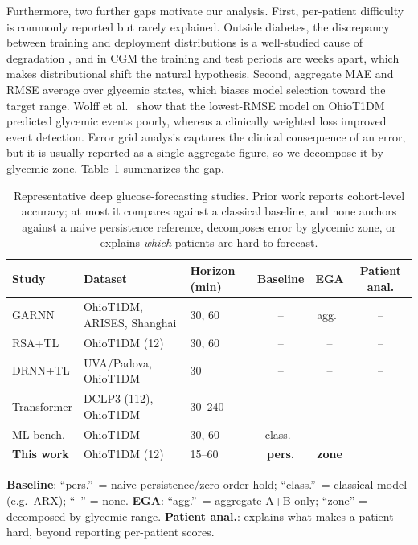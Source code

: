 \documentclass[conference]{IEEEtran}
\newcommand{\yes}{\checkmark}
\newcommand{\no}{--}
\begin{document}
Furthermore, two further gaps motivate our analysis. First, per-patient difficulty is commonly
reported but rarely explained. Outside diabetes, the discrepancy between training
and deployment distributions is a well-studied cause of degradation
\cite{QuinoneroCandela2009, MorenoTorres2012}, and in CGM the training and test
periods are weeks apart, which makes distributional shift the natural hypothesis. Second, aggregate MAE and RMSE average over
glycemic states, which biases model selection toward the target range. Wolff et
al.~\cite{Wolff2025} show that the lowest-RMSE model on OhioT1DM predicted glycemic
events poorly, whereas a clinically weighted loss improved event detection. Error
grid analysis \cite{Clarke1987ClinicalAccuracy, Parkes2000Consensus} captures the
clinical consequence of an error, but it is usually reported as a single aggregate
figure, so we decompose it by glycemic zone. Table~\ref{tab:related} summarizes the gap.

\begin{table}[t]
\centering
\caption{Representative deep glucose-forecasting studies. Prior work reports
cohort-level accuracy; at most it compares against a classical baseline, and none
anchors against a naive persistence reference, decomposes error by glycemic zone,
or explains \emph{which} patients are hard to forecast.}
\label{tab:related}
\scriptsize
\setlength{\tabcolsep}{3.5pt}
\renewcommand{\arraystretch}{1.15}
\begin{tabular}{@{}p{1.55cm}p{1.5cm}p{0.85cm}ccc@{}}
\toprule
\textbf{Study} & \textbf{Dataset} & \textbf{Horizon (min)} &
\textbf{Baseline} & \textbf{EGA} & \textbf{Patient anal.} \\
\midrule
GARNN \cite{Piao2025}          & OhioT1DM, ARISES, Shanghai & 30, 60  & \no  & agg.\ & \no \\
RSA+TL \cite{CUI9474665}       & OhioT1DM (12)              & 30, 60  & \no  & \no   & \no \\
DRNN+TL \cite{Zhu2020Dilated}  & UVA/Padova, OhioT1DM       & 30      & \no  & \no   & \no \\
Transformer \cite{Karagoz2025} & DCLP3 (112), OhioT1DM      & 30--240 & \no  & \no   & \no \\
ML bench.\ \cite{XieWang2020}  & OhioT1DM                   & 30, 60  & class.\ & \no   & \no \\
\midrule
\textbf{This work} & OhioT1DM (12) & 15--60 & \textbf{pers.} & \textbf{zone} & \textbf{\yes} \\
\bottomrule
\end{tabular}
\vspace{2pt}
\raggedright
\scriptsize
\textbf{Baseline}: ``pers.''\ = naive persistence/zero-order-hold; ``class.''\ =
classical model (e.g.\ ARX); ``\no'' = none.
\textbf{EGA}: ``agg.''\ = aggregate A+B only; ``zone'' = decomposed by glycemic
range. \textbf{Patient anal.}: explains what makes a patient hard, beyond
reporting per-patient scores.
\end{table}
\end{document}
